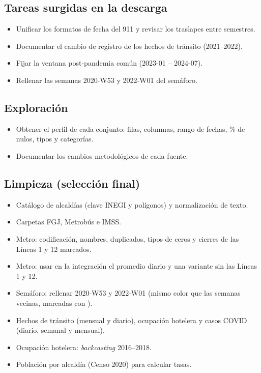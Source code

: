 \subsection{Tareas surgidas en la descarga}
\begin{itemize}[label={}]
  \item \falta{} Unificar los formatos de fecha del 911 y revisar los traslapes entre semestres.
  \item \falta{} Documentar el cambio de registro de los hechos de tránsito (2021--2022).
  \item \falta{} Fijar la ventana post-pandemia común (2023-01 -- 2024-07).
  \item \hecho{} Rellenar las semanas 2020-W53 y 2022-W01 del semáforo.
\end{itemize}

\subsection{Exploración}
\begin{itemize}[label={}]
  \item \falta{} Obtener el perfil de cada conjunto: filas, columnas, rango de fechas, \% de nulos, tipos y categorías.
  \item \falta{} Documentar los cambios metodológicos de cada fuente.
\end{itemize}

\subsection{Limpieza (selección final)}
\begin{itemize}[label={}]
  \item \hecho{} Catálogo de alcaldías (clave INEGI y polígonos) y normalización de texto.
  \item \hecho{} Carpetas FGJ, Metrobús e IMSS.
  \item \hecho{} Metro: codificación, nombres, duplicados, tipos de ceros y cierres de las Líneas 1 y 12 marcados.
  \item \falta{} Metro: usar en la integración el promedio diario y una variante sin las Líneas 1 y 12.
  \item \hecho{} Semáforo: rellenar 2020-W53 y 2022-W01 (mismo color que las semanas vecinas, marcadas con ).
  \item \hecho{} Hechos de tránsito (mensual y diario), ocupación hotelera y casos COVID (diario, semanal y mensual).
  \item \falta{} Ocupación hotelera: \emph{backcasting} 2016--2018.
  \item \falta{} Población por alcaldía (Censo 2020) para calcular tasas.
\end{itemize}

